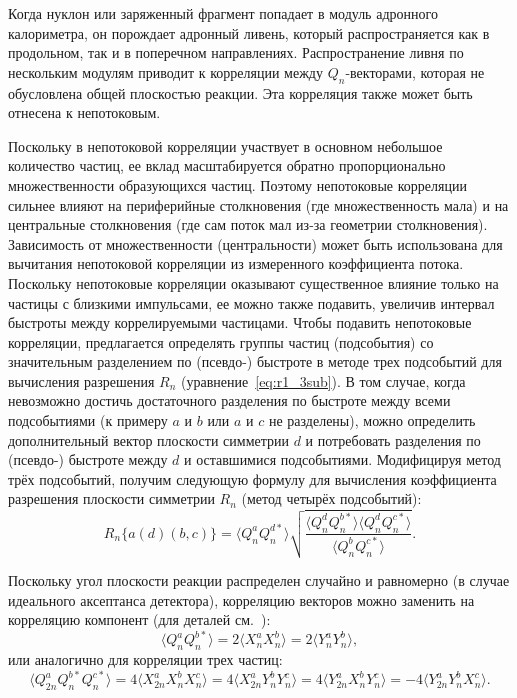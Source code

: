 Когда нуклон или заряженный фрагмент попадает в модуль адронного калориметра, он порождает адронный ливень, который распространяется как в продольном, так и в поперечном направлениях.
Распространение ливня по нескольким модулям приводит к корреляции между $Q_n$-векторами, которая не обусловлена общей плоскостью реакции. 
Эта корреляция также может быть отнесена к непотоковым.

Поскольку в непотоковой корреляции участвует в основном небольшое количество частиц, ее вклад масштабируется обратно пропорционально множественности образующихся частиц. 
Поэтому непотоковые корреляции сильнее влияют на периферийные столкновения (где множественность мала) и на центральные столкновения (где сам поток мал из-за геометрии столкновения). 
Зависимость от множественности (центральности) может быть использована для вычитания
непотоковой корреляции из измеренного коэффициента потока. 
Поскольку непотоковые корреляции оказывают существенное влияние только на частицы с близкими импульсами,
ее можно также подавить, увеличив интервал быстроты между коррелируемыми частицами. 
Чтобы подавить непотоковые корреляции, предлагается определять группы частиц (подсобытия) со значительным разделением по (псевдо-) быстроте в методе трех подсобытий для вычисления разрешения $R_n$ (уравнение~\ref{eq:r1_3sub}). 
В том случае, когда невозможно достичь достаточного разделения по быстроте между всеми подсобытиями (к примеру $a$ и $b$ или $a$ и $c$ не разделены), можно определить дополнительный вектор плоскости симметрии $d$ и потребовать разделения по (псевдо-)
быстроте между $d$ и оставшимися подсобытиями. 
Модифицируя метод трёх подсобытий, получим следующую формулу для вычисления коэффициента разрешения
плоскости симметрии $R_n$ (метод четырёх подсобытий):
\begin{equation}
    R_n\{a(d)(b,c)\} = \langle Q_n^a Q_n^{d*} \rangle \sqrt{ \frac{  \langle Q_n^d Q_n^{b*} \rangle \langle Q_n^d Q_n^{c*} \rangle }{  \langle Q_n^b Q_n^{c*} \rangle } }.
    \label{eq:r1_4sub}
\end{equation}

Поскольку угол плоскости реакции распределен случайно и равномерно (в случае идеального аксептанса детектора), корреляцию векторов можно заменить на корреляцию компонент (для деталей см.~\cite{Voloshin:1994mz,Voloshin:2008dg,Mamaev:2023yhz}):
%
\begin{equation}
    \langle Q_n^{a} Q_n^{b*} \rangle = 
    2 \langle X_n^a X_n^b \rangle =
    2 \langle Y_n^a Y_n^b \rangle,
    \label{eq:components_2part}
\end{equation}
%
или аналогично для корреляции трех частиц:
\begin{equation}
    \langle Q_{2n}^{a} Q_n^{b*}  Q_n^{c*} \rangle = 
    4 \langle X_{2n}^a X_n^b  X_n^c \rangle =
    4 \langle X_{2n}^a Y_n^b  Y_n^c \rangle =
    4 \langle Y_{2n}^a X_n^b  Y_n^c \rangle =
    -4 \langle Y_{2n}^a Y_n^b  X_n^c \rangle.
    \label{eq:components_3part}
\end{equation}

